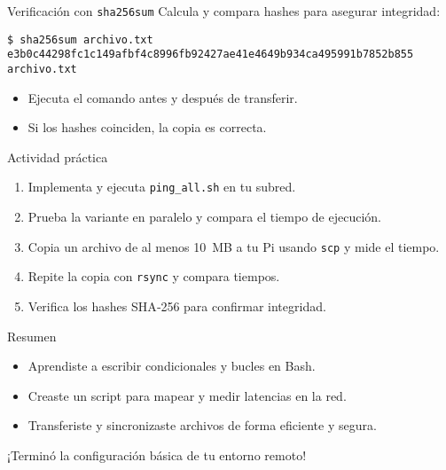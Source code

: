 \documentclass[aspectratio=169,professionalfonts]{beamer}
\begin{document}
\begin{frame}[fragile]{Verificación con \texttt{sha256sum}}
  Calcula y compara hashes para asegurar integridad:
  \begin{verbatim}
$ sha256sum archivo.txt
e3b0c44298fc1c149afbf4c8996fb92427ae41e4649b934ca495991b7852b855  archivo.txt
  \end{verbatim}
  \begin{itemize}
    \item Ejecuta el comando antes y después de transferir.
    \item Si los hashes coinciden, la copia es correcta.
  \end{itemize}
\end{frame}

\begin{frame}[fragile]{Actividad práctica}
  \begin{enumerate}
    \item Implementa y ejecuta \texttt{ping\_all.sh} en tu subred.
    \item Prueba la variante en paralelo y compara el tiempo de ejecución.
    \item Copia un archivo de al menos 10 MB a tu Pi usando \texttt{scp} y mide el tiempo.
    \item Repite la copia con \texttt{rsync} y compara tiempos.
    \item Verifica los hashes SHA‑256 para confirmar integridad.
  \end{enumerate}
\end{frame}

\begin{frame}[fragile]{Resumen}
  \begin{itemize}
    \item Aprendiste a escribir condicionales y bucles en Bash.
    \item Creaste un script para mapear y medir latencias en la red.
    \item Transferiste y sincronizaste archivos de forma eficiente y segura.
  \end{itemize}
  \vspace{0.5em}
  ¡Terminó la configuración básica de tu entorno remoto!
\end{frame}
\end{document}
